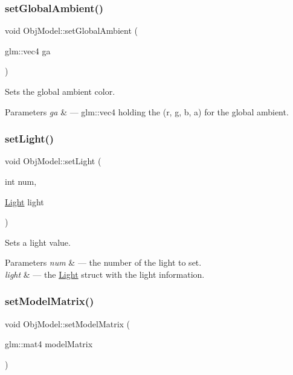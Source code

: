 \subsubsection{\texorpdfstring{set\+Global\+Ambient()}{setGlobalAmbient()}}
{\footnotesize\ttfamily void Obj\+Model\+::set\+Global\+Ambient (\begin{DoxyParamCaption}\item[{glm\+::vec4}]{ga }\end{DoxyParamCaption})}



Sets the global ambient color. 


\begin{DoxyParams}{Parameters}
{\em ga} & --- glm\+::vec4 holding the (r, g, b, a) for the global ambient. \\
\hline
\end{DoxyParams}
\mbox{\label{class_obj_model_abe58ee93a5a91f88c52f7b28c1fa6723}} 
\subsubsection{\texorpdfstring{set\+Light()}{setLight()}}
{\footnotesize\ttfamily void Obj\+Model\+::set\+Light (\begin{DoxyParamCaption}\item[{int}]{num,  }\item[{\hyperlink{class_light}{Light}}]{light }\end{DoxyParamCaption})}



Sets a light value. 


\begin{DoxyParams}{Parameters}
{\em num} & --- the number of the light to set.\\
\hline
{\em light} & --- the \hyperlink{class_light}{Light} struct with the light information. \\
\hline
\end{DoxyParams}
\mbox{\label{class_obj_model_a0f4eabd61e3874a123b2fe5dc44c4ca7}} 
\subsubsection{\texorpdfstring{set\+Model\+Matrix()}{setModelMatrix()}}
{\footnotesize\ttfamily void Obj\+Model\+::set\+Model\+Matrix (\begin{DoxyParamCaption}\item[{glm\+::mat4}]{model\+Matrix }\end{DoxyParamCaption})}



